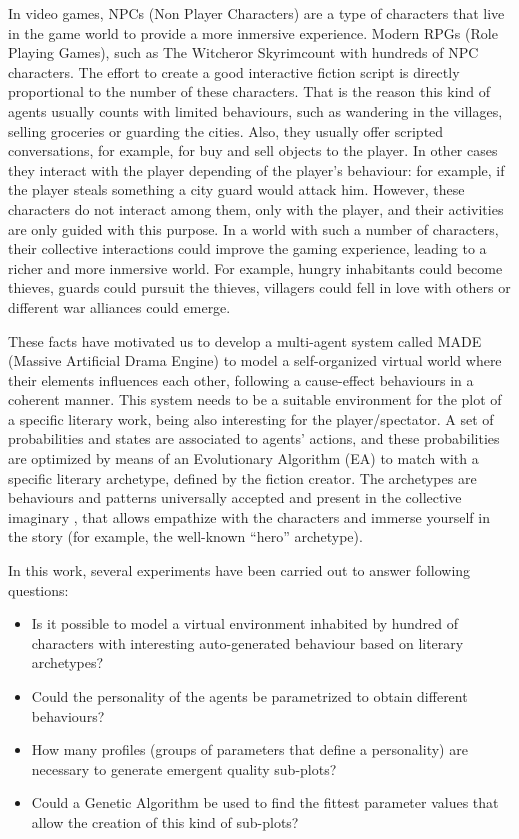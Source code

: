 \documentclass[runningheads]{llncs}
\begin{document}
In video games, NPCs (Non Player Characters) are a type of characters that live in the game world to provide a more inmersive experience. Modern RPGs (Role Playing Games), such as The Witcher\texttrademark or Skyrim\texttrademark count with hundreds of NPC characters. The effort to create a good interactive fiction script is directly proportional to the number of these characters. That is the reason this kind of agents usually counts with limited behaviours, such as wandering in the villages, selling groceries or guarding the cities. Also, they usually offer scripted conversations, for example, for buy and sell objects to the player. In other cases they interact with the player depending of the player's behaviour: for example, if the player steals something a city guard would attack him.  However, these characters do not interact among them, only with the player, and their activities are only guided with this purpose. In a world with such a number of characters, their collective interactions could improve the gaming experience, leading to a richer and more inmersive world. For example, hungry inhabitants could become thieves, guards could pursuit the thieves, villagers could fell in love with others or different war alliances could emerge.

These facts have motivated us to develop a multi-agent system called MADE (Massive Artificial Drama Engine) to model a self-organized virtual world where their elements influences each other, following a cause-effect behaviours in a coherent manner. This system needs to be a suitable environment for the plot of a specific literary work, being also interesting for the player/spectator. A set of probabilities and states are associated to agents' actions, and these probabilities are optimized by means of an Evolutionary Algorithm (EA) to match with a specific literary archetype, defined by the fiction creator. The archetypes are behaviours and patterns universally accepted and present in the collective imaginary \cite{ArchetypesGarry05}, that allows empathize with the characters and immerse yourself in the story (for example, the well-known ``hero'' archetype).

In this work, several experiments have been carried out to answer following questions: 


\begin{itemize}
 \item Is it possible to model a virtual environment inhabited by hundred of characters with interesting auto-generated behaviour based on literary archetypes?
 \item Could the personality of the agents be parametrized to obtain different behaviours? 
 \item How many profiles (groups of parameters that define a personality) are necessary to generate emergent quality sub-plots?
 \item Could a Genetic Algorithm be used to find the fittest parameter values that allow the creation of this kind of sub-plots?

\end{itemize}
\end{document}
